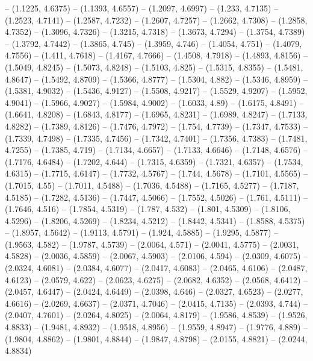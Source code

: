 {  -- (1.1225, 4.6375) -- (1.1393, 4.6557) -- (1.2097, 4.6997) -- (1.233, 4.7135)
   -- (1.2523, 4.7141) -- (1.2587, 4.7232) -- (1.2607, 4.7257) -- (1.2662, 
  4.7308) -- (1.2858, 4.7352) -- (1.3096, 4.7326) -- (1.3215, 4.7318) -- 
  (1.3673, 4.7294) -- (1.3754, 4.7389) -- (1.3792, 4.7442) -- (1.3865, 4.745) --
   (1.3959, 4.746) -- (1.4054, 4.751) -- (1.4079, 4.7556) -- (1.411, 4.7618) -- 
  (1.4167, 4.7666) -- (1.4508, 4.7918) -- (1.4893, 4.8156) -- (1.5049, 4.8245) 
  -- (1.5073, 4.8248) -- (1.5103, 4.825) -- (1.5315, 4.8355) -- (1.5481, 4.8647)
   -- (1.5492, 4.8709) -- (1.5366, 4.8777) -- (1.5304, 4.882) -- (1.5346, 
  4.8959) -- (1.5381, 4.9032) -- (1.5436, 4.9127) -- (1.5508, 4.9217) -- 
  (1.5529, 4.9207) -- (1.5952, 4.9041) -- (1.5966, 4.9027) -- (1.5984, 4.9002) 
  -- (1.6033, 4.89) -- (1.6175, 4.8491) -- (1.6641, 4.8208) -- (1.6843, 4.8177) 
  -- (1.6965, 4.8231) -- (1.6989, 4.8247) -- (1.7133, 4.8282) -- (1.7389, 
  4.8126) -- (1.7476, 4.7972) -- (1.754, 4.7739) -- (1.7347, 4.7533) -- (1.7339,
   4.7498) -- (1.7335, 4.7456) -- (1.7342, 4.7401) -- (1.7356, 4.7383) -- 
  (1.7481, 4.7255) -- (1.7385, 4.719) -- (1.7134, 4.6657) -- (1.7133, 4.6646) --
   (1.7148, 4.6576) -- (1.7176, 4.6484) -- (1.7202, 4.644) -- (1.7315, 4.6359) 
  -- (1.7321, 4.6357) -- (1.7534, 4.6315) -- (1.7715, 4.6147) -- (1.7732, 
  4.5767) -- (1.744, 4.5678) -- (1.7101, 4.5565) -- (1.7015, 4.55) -- (1.7011, 
  4.5488) -- (1.7036, 4.5488) -- (1.7165, 4.5277) -- (1.7187, 4.5185) -- 
  (1.7282, 4.5136) -- (1.7447, 4.5066) -- (1.7552, 4.5026) -- (1.761, 4.5111) --
   (1.7646, 4.516) -- (1.7854, 4.5319) -- (1.787, 4.532) -- (1.801, 4.5309) -- 
  (1.8106, 4.5296) -- (1.8206, 4.5269) -- (1.8234, 4.5212) -- (1.8442, 4.5341) 
  -- (1.8588, 4.5375) -- (1.8957, 4.5642) -- (1.9113, 4.5791) -- (1.924, 4.5885)
   -- (1.9295, 4.5877) -- (1.9563, 4.582) -- (1.9787, 4.5739) -- (2.0064, 4.571)
   -- (2.0041, 4.5775) -- (2.0031, 4.5828) -- (2.0036, 4.5859) -- (2.0067, 
  4.5903) -- (2.0106, 4.594) -- (2.0309, 4.6075) -- (2.0324, 4.6081) -- (2.0384,
   4.6077) -- (2.0417, 4.6083) -- (2.0465, 4.6106) -- (2.0487, 4.6123) -- 
  (2.0579, 4.622) -- (2.0623, 4.6275) -- (2.0682, 4.6352) -- (2.0568, 4.6412) --
   (2.0457, 4.6447) -- (2.0424, 4.6449) -- (2.0398, 4.646) -- (2.0327, 4.6523) 
  -- (2.0277, 4.6616) -- (2.0269, 4.6637) -- (2.0371, 4.7046) -- (2.0415, 
  4.7135) -- (2.0393, 4.744) -- (2.0407, 4.7601) -- (2.0264, 4.8025) -- (2.0064,
   4.8179) -- (1.9586, 4.8539) -- (1.9526, 4.8833) -- (1.9481, 4.8932) -- 
  (1.9518, 4.8956) -- (1.9559, 4.8947) -- (1.9776, 4.889) -- (1.9804, 4.8862) --
   (1.9801, 4.8844) -- (1.9847, 4.8798) -- (2.0155, 4.8821) -- (2.0244, 4.8834) 
}
